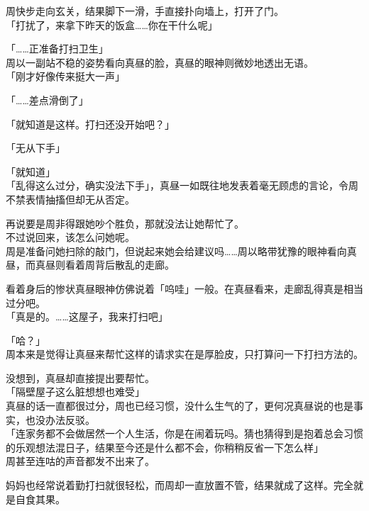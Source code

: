 周快步走向玄关，结果脚下一滑，手直接扑向墙上，打开了门。\\

「打扰了，来拿下昨天的饭盒……你在干什么呢」

「……正准备打扫卫生」\\

周以一副站不稳的姿势看向真昼的脸，真昼的眼神则微妙地透出无语。\\

「刚才好像传来挺大一声」

「……差点滑倒了」

「就知道是这样。打扫还没开始吧？」

「无从下手」

「就知道」\\

「乱得这么过分，确实没法下手」，真昼一如既往地发表着毫无顾虑的言论，令周不禁表情抽搐但却无从否定。

再说要是周非得跟她吵个胜负，那就没法让她帮忙了。\\

不过说回来，该怎么问她呢。\\

周是准备问她扫除的敲门，但说起来她会给建议吗……周以略带犹豫的眼神看向真昼，而真昼则看着周背后散乱的走廊。

看着身后的惨状真昼眼神仿佛说着「呜哇」一般。在真昼看来，走廊乱得真是相当过分吧。\\

「真是的。……这屋子，我来打扫吧」

「哈？」\\

周本来是觉得让真昼来帮忙这样的请求实在是厚脸皮，只打算问一下打扫方法的。

没想到，真昼却直接提出要帮忙。\\

「隔壁屋子这么脏想想也难受」\\

真昼的话一直都很过分，周也已经习惯，没什么生气的了，更何况真昼说的也是事实，也没办法反驳。\\

「连家务都不会做居然一个人生活，你是在闹着玩吗。猜也猜得到是抱着总会习惯的乐观想法混日子，结果至今还是什么都不会，你稍稍反省一下怎么样」\\

周甚至连咕的声音都发不出来了。

妈妈也经常说着勤打扫就很轻松，而周却一直放置不管，结果就成了这样。完全就是自食其果。\\

